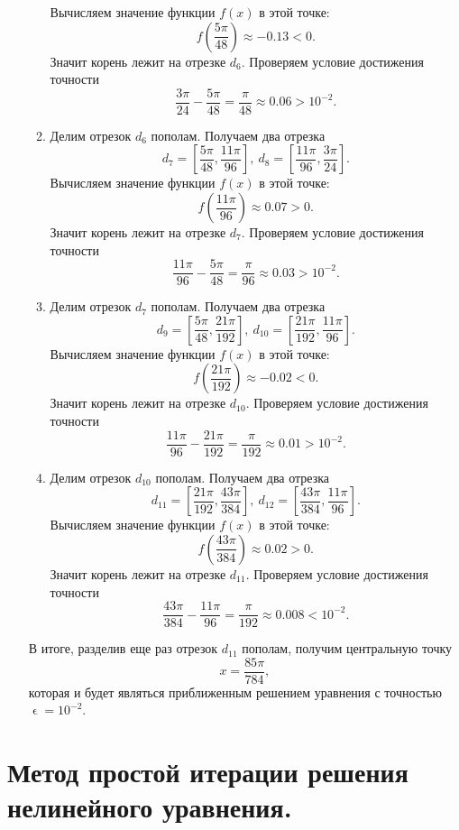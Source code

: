 \documentclass[a4paper, 12pt]{report}
\renewcommand{\epsilon}{\upvarepsilon}
\begin{document}
\begin{enumerate}
\begin{enumerate}
			Вычисляем значение функции $f(x)$ в этой точке:
			$$f\left(\dfrac{5\pi}{48}\right) \approx -0.13 < 0.$$
			Значит корень лежит на отрезке $d_6$. Проверяем условие достижения точности $$\dfrac{3\pi}{24} - \dfrac{5\pi}{48} = \dfrac \pi{48}\approx 0.06 > 10^{-2}.$$ 
			\item Делим отрезок $d_6$ пополам. Получаем два отрезка $$d_7 = \left[\dfrac {5\pi} {48}, \dfrac {11\pi} {96}\right],\ d_8 = \left[\dfrac {11\pi} {96}, \dfrac {3\pi} {24}\right].$$ 
			Вычисляем значение функции $f(x)$ в этой точке:
			$$f\left(\dfrac{11\pi}{96}\right) \approx 0.07 > 0.$$
			Значит корень лежит на отрезке $d_7$. Проверяем условие достижения точности $$\dfrac{11\pi}{96} - \dfrac{5\pi}{48} = \dfrac \pi{96}\approx 0.03 > 10^{-2}.$$ 
			\item  Делим отрезок $d_7$ пополам. Получаем два отрезка $$d_9 = \left[\dfrac {5\pi} {48}, \dfrac {21\pi} {192}\right],\ d_{10} = \left[\dfrac {21\pi} {192}, \dfrac {11\pi} {96}\right].$$ 
			Вычисляем значение функции $f(x)$ в этой точке:
			$$f\left(\dfrac {21\pi} {192}\right) \approx -0.02 < 0.$$
			Значит корень лежит на отрезке $d_{10}$. Проверяем условие достижения точности $$\dfrac{11\pi}{96}-\dfrac {21\pi} {192}  = \dfrac \pi{192}\approx 0.01 > 10^{-2}.$$ 
			\item  Делим отрезок $d_{10}$ пополам. Получаем два отрезка $$d_{11} = \left[\dfrac {21\pi} {192}, \dfrac {43\pi} {384}\right],\ d_{12} = \left[\dfrac {43\pi} {384}, \dfrac {11\pi} {96}\right].$$ 
			Вычисляем значение функции $f(x)$ в этой точке:
			$$f\left(\dfrac {43\pi} {384}\right) \approx 0.02 > 0.$$
			Значит корень лежит на отрезке $d_{11}$. Проверяем условие достижения точности $$\dfrac {43\pi} {384} - \dfrac{11\pi}{96} = \dfrac \pi{192}\approx 0.008 < 10^{-2}.$$
		\end{enumerate}
		В итоге, разделив еще раз отрезок $d_{11}$ пополам, получим центральную точку $$x = \dfrac{85 \pi}{784},$$ которая и будет являться приближенным решением уравнения с точностью $\epsilon = 10^{-2}$.
		
	\end{enumerate}
	\section{Метод простой итерации решения нелинейного уравнения.}
\end{document}

